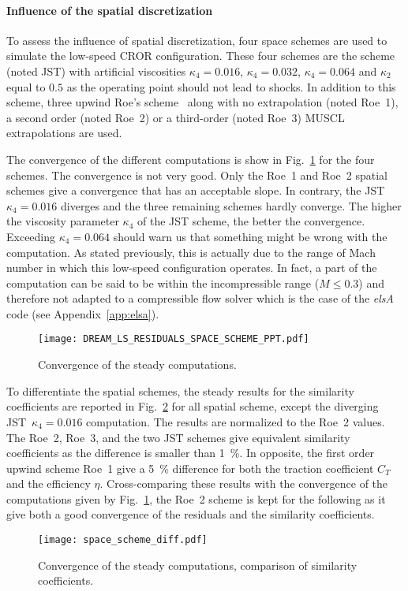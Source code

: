 \paragraph{Influence of the spatial discretization} %
\label{sub:dream_ls_spatial_discretization}

To assess the influence of spatial discretization, four 
space schemes are used to simulate the low-speed CROR configuration.
These four schemes are the \citet{Jameson1981} scheme (noted JST) with artificial
viscosities $\kappa_4 = 0.016$, $\kappa_4 = 0.032$, $\kappa_4 = 0.064$
and $\kappa_2$ equal to $0.5$ as the operating point should not 
lead to shocks. In addition to this scheme, three upwind
Roe's scheme~\cite{Roe1981} along with no extrapolation (noted Roe~1),
a second order (noted Roe~2) or a third-order (noted Roe~3) 
MUSCL extrapolations are used.

The convergence of the different computations is show 
in Fig.~\ref{fig:dream_ls_space_scheme_residual}
for the four schemes. The convergence is not 
very good. Only the Roe~1 and Roe~2 spatial schemes give 
a convergence that has an acceptable slope. In contrary,
the JST~$\kappa_4 = 0.016$ diverges and the three
remaining schemes hardly converge. The higher the
viscosity parameter $\kappa_4$ of the JST scheme, the better
the convergence. Exceeding $\kappa_4 = 0.064$ should
warn us that something might be wrong with the computation.
As stated previously, this is actually due to the range of Mach
number in which this low-speed configuration operates. In fact,
a part of the computation can be said to be within the incompressible
range ($M \leq 0.3$) and therefore not adapted to a compressible
flow solver which is the case of the \emph{elsA} code 
(see Appendix~\ref{app:elsa}).
\begin{figure}[htb]
  \centering
  \texttt{[image: DREAM\_LS\_RESIDUALS\_SPACE\_SCHEME\_PPT.pdf]}
  \caption{Convergence of the steady computations.}
  \label{fig:dream_ls_space_scheme_residual}
\end{figure}

To differentiate the spatial schemes, 
the steady results for the similarity coefficients are reported
in Fig.~\ref{fig:dream_ls_space_scheme_coeff} for all spatial scheme, 
except the diverging JST~$\kappa_4 = 0.016$ computation.
The results are normalized to the Roe~2 values.
The Roe~2, Roe~3, and the two JST schemes give equivalent
similarity coefficients as the difference is smaller than 1~\%.
In opposite, the first order upwind scheme Roe~1 give a 5~\%
difference for both the traction coefficient $C_T$ and the efficiency $\eta$.
Cross-comparing these results with the convergence of the computations
given by Fig.~\ref{fig:dream_ls_space_scheme_residual}, the Roe~2
scheme is kept for the following as it give both a good convergence
of the residuals and the similarity coefficients.
\begin{figure}[htb]
  \centering
  \texttt{[image: space\_scheme\_diff.pdf]}
  \caption{Convergence of the steady computations, comparison of similarity coefficients.}
  \label{fig:dream_ls_space_scheme_coeff}
\end{figure}
